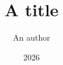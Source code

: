 \documentclass{beamer}
\title{A title}
\author{An author}
\institute{Faculty of Engineering \\ University of Somewhere}
\date{2026}
\begin{document}
\begin{frame}
\titlepage
\end{frame}
\end{document}

